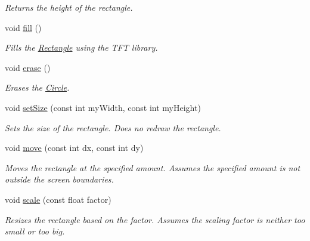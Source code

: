 \begin{DoxyCompactItemize}
\begin{DoxyCompactList}\small\item\em Returns the height of the rectangle. \end{DoxyCompactList}\item 
\hypertarget{class_rectangle_a59d805919cfe95604336afb6e9d54f6f}{void \hyperlink{class_rectangle_a59d805919cfe95604336afb6e9d54f6f}{fill} ()}\label{class_rectangle_a59d805919cfe95604336afb6e9d54f6f}

\begin{DoxyCompactList}\small\item\em Fills the \hyperlink{class_rectangle}{Rectangle} using the T\+F\+T library. \end{DoxyCompactList}\item 
\hypertarget{class_rectangle_a9f94abb9cfdaa389559552bfd56850c2}{void \hyperlink{class_rectangle_a9f94abb9cfdaa389559552bfd56850c2}{erase} ()}\label{class_rectangle_a9f94abb9cfdaa389559552bfd56850c2}

\begin{DoxyCompactList}\small\item\em Erases the \hyperlink{class_circle}{Circle}. \end{DoxyCompactList}\item 
void \hyperlink{class_rectangle_aa6f0b3ca31c9bc2fe7094e1859e22650}{set\+Size} (const int my\+Width, const int my\+Height)
\begin{DoxyCompactList}\small\item\em Sets the size of the rectangle. Does no redraw the rectangle. \end{DoxyCompactList}\item 
void \hyperlink{class_rectangle_a834f54f7040623d8bae999580b02b2b1}{move} (const int dx, const int dy)
\begin{DoxyCompactList}\small\item\em Moves the rectangle at the specified amount. Assumes the specified amount is not outside the screen boundaries. \end{DoxyCompactList}\item 
void \hyperlink{class_rectangle_a823b01fda97c5d8d6252e526c3e1e27e}{scale} (const float factor)
\begin{DoxyCompactList}\small\item\em Resizes the rectangle based on the factor. Assumes the scaling factor is neither too small or too big. \end{DoxyCompactList}\end{DoxyCompactItemize}

